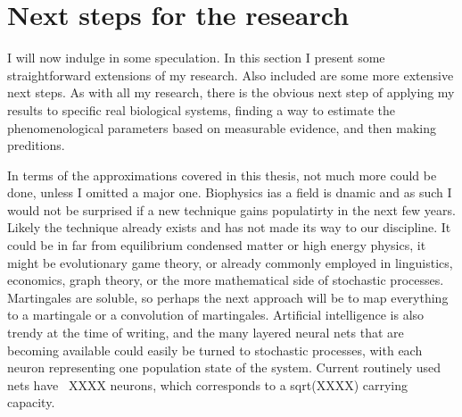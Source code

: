 

\section{Next steps for the research}
I will now indulge in some speculation. 
In this section I present some straightforward extensions of my research. 
Also included are some more extensive next steps. 
As with all my research, there is the obvious next step of applying my results to specific real biological systems, finding a way to estimate the phenomenological parameters based on measurable evidence, and then making preditions. 

In terms of the approximations covered in this thesis, not much more could be done, unless I omitted a major one. 
Biophysics ias a field is dnamic and as such I would not be surprised if a new technique gains populatirty in the next few years. 
Likely the technique already exists and has not made its way to our discipline. 
It could be in far from equilibrium condensed matter or high energy physics, it might be evolutionary game theory, or already commonly employed in linguistics, economics, graph theory, or the more mathematical side of stochastic processes. 
Martingales are soluble, so perhaps the next approach will be to map everything to a martingale or a convolution of martingales. 
Artificial intelligence is also trendy at the time of writing, and the many layered neural nets that are becoming available could easily be turned to stochastic processes, with each neuron representing one population state of the system. 
Current routinely used nets have ~XXXX neurons, which corresponds to a sqrt(XXXX) carrying capacity. 

